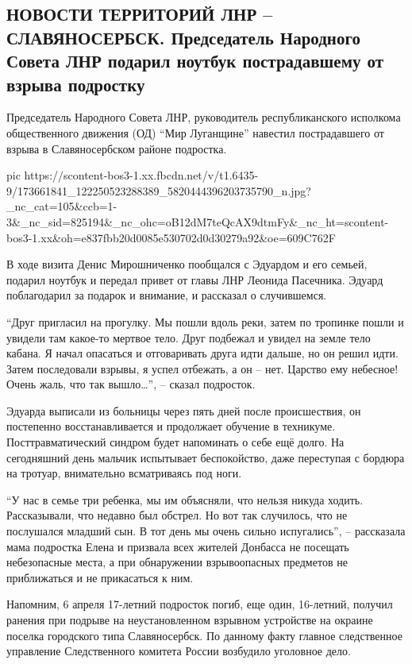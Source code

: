  
 
 
 
 

\subsection{НОВОСТИ ТЕРРИТОРИЙ ЛНР – СЛАВЯНОСЕРБСК. Председатель Народного Совета ЛНР подарил ноутбук пострадавшему от взрыва подростку}

Председатель Народного Совета ЛНР, руководитель республиканского исполкома
общественного движения (ОД) \enquote{Мир Луганщине} навестил пострадавшего от взрыва в
Славяносербском районе подростка. 


\ifcmt
  pic https://scontent-bos3-1.xx.fbcdn.net/v/t1.6435-9/173661841_122250523288389_5820444396203735790_n.jpg?_nc_cat=105&ccb=1-3&_nc_sid=825194&_nc_ohc=oB12dM7teQcAX9dtmFy&_nc_ht=scontent-bos3-1.xx&oh=e837fbb20d0085e530702d0d30279a92&oe=609C762F
\fi


В ходе визита Денис Мирошниченко пообщался с Эдуардом и его семьей, подарил
ноутбук и передал привет от главы ЛНР Леонида Пасечника. Эдуард поблагодарил за
подарок и внимание, и рассказал о случившемся.

\enquote{Друг пригласил на прогулку. Мы пошли вдоль реки, затем по тропинке пошли и
увидели там какое-то мертвое тело. Друг подбежал и увидел на земле тело кабана.
Я начал опасаться и отговаривать друга идти дальше, но он решил идти. Затем
последовали взрывы, я успел отбежать, а он – нет. Царство ему небесное! Очень
жаль, что так вышло…}, – сказал подросток.

Эдуарда выписали из больницы через пять дней после происшествия, он постепенно
восстанавливается и продолжает обучение в техникуме. Посттравматический синдром
будет напоминать о себе ещё долго. На сегодняшний день мальчик испытывает
беспокойство, даже переступая с бордюра на тротуар, внимательно всматриваясь
под ноги. 

\enquote{У нас в семье три ребенка, мы им объясняли, что нельзя никуда ходить.
Рассказывали, что недавно был обстрел. Но вот так случилось, что не послушался
младший сын. В тот день мы очень сильно испугались}, – рассказала мама
подростка Елена и призвала всех жителей Донбасса не посещать небезопасные
места, а при обнаружении взрывоопасных предметов не приближаться и не
прикасаться к ним.

Напомним, 6 апреля 17-летний подросток погиб, еще один, 16-летний, получил
ранения при подрыве на неустановленном взрывном устройстве на окраине поселка
городского типа Славяносербск. По данному факту главное следственное управление
Следственного комитета России возбудило уголовное дело.
